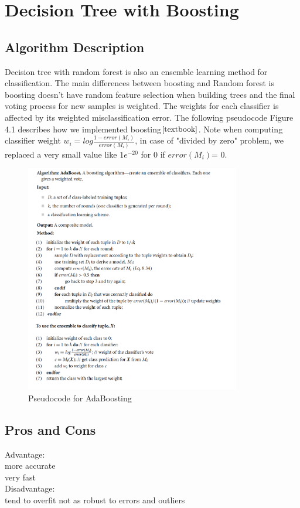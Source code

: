 \documentclass[paper=letter, fontsize=11pt]{article}
\numberwithin{equation}{section}		%
\numberwithin{figure}{section}			%
\numberwithin{table}{section}				%
\begin{document}
\section{Decision Tree with Boosting}
\subsection{Algorithm Description}
Decision tree with random forest is also an ensemble learning method for classification.
The main differences between boosting and Random forest is boosting doesn't
have random feature selection when building trees and the final voting process for
new samples is weighted. The weights for each classifier is affected by its weighted
misclassification error. The following pseudocode Figure 4.1 describes how we implemented
boosting$\cite{textbook}$. Note when computing classifier weight $w_{i} = log\frac{1-error(M_{i})}{error(M_{i})}$, in case of "divided by zero" problem, we replaced a very small value like $1e^{-20}$ for 0 if  $error(M_{i})$= 0.
\begin{figure}[h]
  \centering
  \includegraphics[width=0.8\linewidth,height=10cm]{boosting.png}
  \caption{Pseudocode for AdaBoosting}
\end{figure}


\subsection{Pros and Cons}
Advantage:\\
more accurate\\
very fast\\
\noindent Disadvantage:\\
tend to overfit
not as robust to errors and outliers
\end{document}
